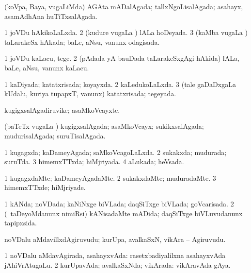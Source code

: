 {{\bentry
{} 
\gl{\gu}
\expl{}
\bmng
(koVpa, Baya, \mo vugaLiMda) AGAta mADalAgada; tallxNgoLisalAgada; asahayx, asamAdhAna huTiTxsalAgada. 
\emng
\eentry

\bentry
{} 
\gl{\gu}
\expl{}
\bmng
\bnum
\num{1} joVDu hAkikoLaLxda. 
\num{2} (kudure \mo vugaLa \vi) lALa hoDeyada. 
\num{3} (kaMba \mo vugaLa \vi) taLarakeSx hAkada; baLe, aNsu, \mo vanunx odagisada. 
\enum
\emng
\eentry

\bentry
{} 
\gl{\sakirx}
\expl{}
\bmng
\bnum
\num{1} joVDu kaLacu, tege. 
\num{2} (pAdada yA bauDada taLarakeSxgAgi hAkida) lALa, baLe, aNsu, \mo vanunx kaLacu. 
\enum
\emng
\eentry

\bentry
{} 
\gl{\gu}
\expl{}
\bmng
\bnum
\num{1} kaDiyada; katatxrisada; koyayxda. 
\num{2} kaLedukoLaLxda. 
\num{3} (tale gaDaDxgaLa kUdalu, kuriya tupapxT, \mo vanunx) katatxrisada; tegeyada. 
\enum
\emng
\eentry

\bentry
{} 
\gl{\nA}
\expl{}
\bmng
kugigxsalAgadiruvike; asaMkoVcayxte. 
\emng
\eentry

\bentry
{} 
\gl{\gu}
\expl{}
\bmng
(baTeTx \mo vugaLa \vi) kugigxsalAgada; asaMkoVcayx; sukikxsalAgada; mudurisalAgada; suruTisalAgada. 
\emng
\eentry

\bentry
{} 
\gl{\gu}
\expl{}
\bmng
\bnum
\num{1} kugagxda; kaDameyAgada; saMkoVcagoLaLxda. 
\num{2} sukakxda; mudurada; suruTda. 
\num{3} himemxTTxda; hiMjriyada. 
\num{4} aLukada; heVsada. 
\enum
\emng
\eentry

\bentry
{} 
\gl{\kirxvi}
\expl{}
\bmng
\bnum
\num{1} kugagxdaMte; kaDameyAgadaMte. 
\num{2} sukakxdaMte; muduradaMte. 
\num{3} himemxTTxde; hiMjriyade. 
\enum
\emng
\eentry

\bentry
{} 
\gl{\gu}
\expl{}
\bmng
\bnum
\num{1} kANda; noVDada; kaNiNxge biVLada; daqSiTxge biVLada; goVcarisada. 
\num{2} (\kanmu\ taDeyoMdanunx nimiRsi) kANisadaMte mADida; daqSiTxge biVLuvudanunx tapipxsida. 
\enum
\emng
\eentry

\bentry
{} 
\gl{\nA}
\expl{}
\bmng
noVDalu aMdavillxdAgiruvudu; kurUpa, avalkaSxN, vikAra -- Agiruvudu. 
\emng
\eentry

\bentry
{} 
\gl{\gu}
\expl{}
\bmng
\bnum
\num{1} noVDalu aMdavAgirada, asahayxvAda:  rasetxbadiyalilxna asahayxvAda jAhiVrAtugaLu. 
\num{2} kurUpavAda; avalkaSxNda; vikArada:  vikAravAda gAya. 
\enum
\emng
\eentry

}}

